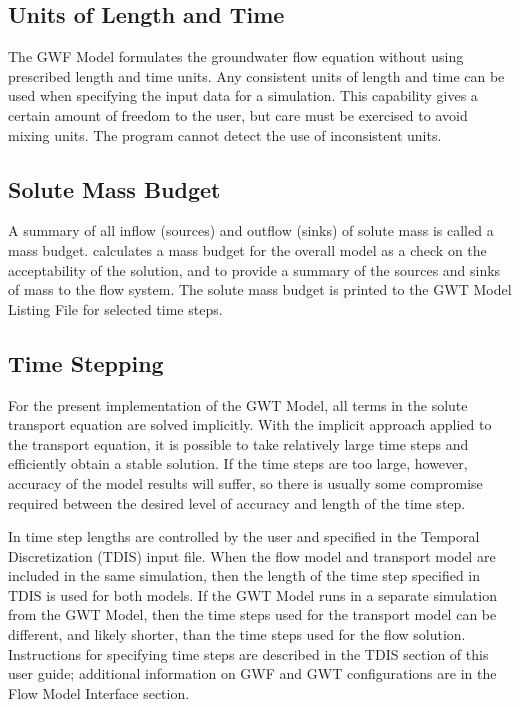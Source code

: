 \subsection{Units of Length and Time}
The GWF Model formulates the groundwater flow equation without using prescribed length and time units. Any consistent units of length and time can be used when specifying the input data for a simulation. This capability gives a certain amount of freedom to the user, but care must be exercised to avoid mixing units.  The program cannot detect the use of inconsistent units.

\subsection{Solute Mass Budget}
A summary of all inflow (sources) and outflow (sinks) of solute mass is called a mass budget.  \mf calculates a mass budget for the overall model as a check on the acceptability of the solution, and to provide a summary of the sources and sinks of mass to the flow system.  The solute mass budget is printed to the GWT Model Listing File for selected time steps.

\subsection{Time Stepping}

For the present implementation of the GWT Model, all terms in the solute transport equation are solved implicitly.  With the implicit approach applied to the transport equation, it is possible to take relatively large time steps and efficiently obtain a stable solution.  If the time steps are too large, however, accuracy of the model results will suffer, so there is usually some compromise required between the desired level of accuracy and length of the time step.

In \mf time step lengths are controlled by the user and specified in the Temporal Discretization (TDIS) input file.  When the flow model and transport model are included in the same simulation, then the length of the time step specified in TDIS is used for both models.  If the GWT Model runs in a separate simulation from the GWT Model, then the time steps used for the transport model can be different, and likely shorter, than the time steps used for the flow solution.  Instructions for specifying time steps are described in the TDIS section of this user guide; additional information on GWF and GWT configurations are in the Flow Model Interface section.  



